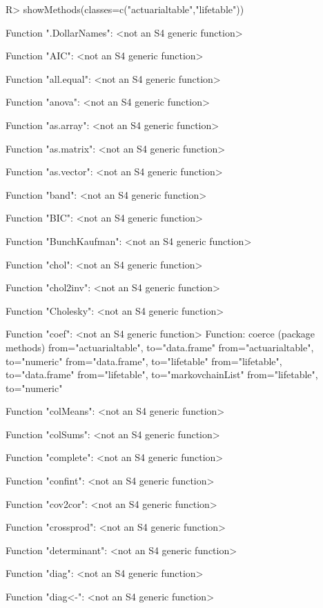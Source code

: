 \documentclass[nojss]{jss}
\begin{document}
\begin{Schunk}
\begin{Sinput}
R> showMethods(classes=c("actuarialtable","lifetable"))
\end{Sinput}
\begin{Soutput}
Function ".DollarNames":
 <not an S4 generic function>

Function "AIC":
 <not an S4 generic function>

Function "all.equal":
 <not an S4 generic function>

Function "anova":
 <not an S4 generic function>

Function "as.array":
 <not an S4 generic function>

Function "as.matrix":
 <not an S4 generic function>

Function "as.vector":
 <not an S4 generic function>

Function "band":
 <not an S4 generic function>

Function "BIC":
 <not an S4 generic function>

Function "BunchKaufman":
 <not an S4 generic function>

Function "chol":
 <not an S4 generic function>

Function "chol2inv":
 <not an S4 generic function>

Function "Cholesky":
 <not an S4 generic function>

Function "coef":
 <not an S4 generic function>
Function: coerce (package methods)
from="actuarialtable", to="data.frame"
from="actuarialtable", to="numeric"
from="data.frame", to="lifetable"
from="lifetable", to="data.frame"
from="lifetable", to="markovchainList"
from="lifetable", to="numeric"


Function "colMeans":
 <not an S4 generic function>

Function "colSums":
 <not an S4 generic function>

Function "complete":
 <not an S4 generic function>

Function "confint":
 <not an S4 generic function>

Function "cov2cor":
 <not an S4 generic function>

Function "crossprod":
 <not an S4 generic function>

Function "determinant":
 <not an S4 generic function>

Function "diag":
 <not an S4 generic function>

Function "diag<-":
 <not an S4 generic function>


\end{Soutput}
\end{Schunk}
\end{document}
